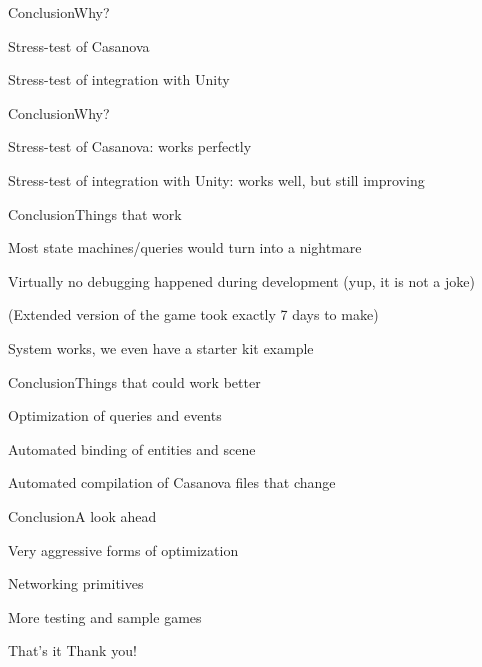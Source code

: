 \documentclass{beamer}
\begin{document}
\begin{slide}{Conclusion}{Why?}{
\item Stress-test of Casanova
\item Stress-test of integration with Unity
}\end{slide}

\begin{slide}{Conclusion}{Why?}{
\item Stress-test of Casanova: works perfectly
\item Stress-test of integration with Unity: works well, but still improving
}\end{slide}

\begin{slide}{Conclusion}{Things that work}{
\item Most state machines/queries would turn into a nightmare
\item Virtually no debugging happened during development (yup, it is not a joke)
\item (Extended version of the game took exactly 7 days to make)
\item System works, we even have a starter kit example
}\end{slide}

\begin{slide}{Conclusion}{Things that could work better}{
\item Optimization of queries and events
\item Automated binding of entities and scene
\item Automated compilation of Casanova files that change
}\end{slide}

\begin{slide}{Conclusion}{A look ahead}{
\item Very aggressive forms of optimization
\item Networking primitives
\item More testing and sample games
}\end{slide}

\begin{frame}{That's it}
\center
\fontsize{18pt}{7.2}\selectfont
Thank you!
\end{frame}
\end{document}
